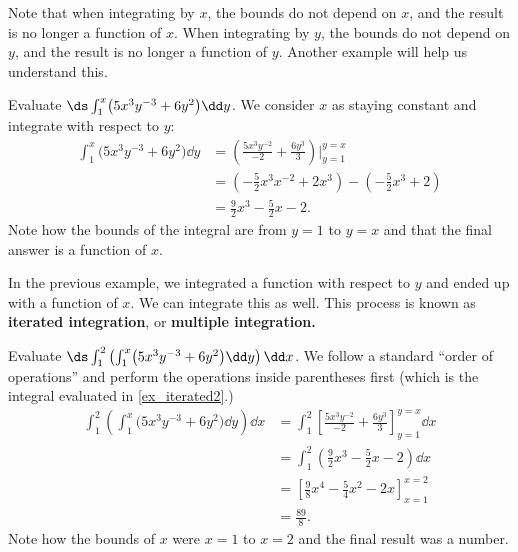 Note that when integrating by $x$, the bounds do not depend on $x$, and the result is no longer a function of $x$.  When integrating by $y$, the bounds do not depend on $y$, and the result is no longer a function of $y$. Another example will help us understand this.

\begin{example}\label{ex_iterated2}%
Evaluate $\ds \int_1^x\bigl(5x^3y^{-3}+6y^2\bigr)\dd y$.
\solution
We consider $x$ as staying constant and integrate with respect to $y$:
\begin{align*}
\int_1^x\bigl(5x^3y^{-3}+6y^2\bigr)\dd y & = \left(\frac{5x^3y^{-2}}{-2}+\frac{6y^3}{3}\right)\Bigg|_{y=1}^{y=x} \\
						&= \left(-\frac52x^3x^{-2}+2x^3\right) - \left(-\frac52x^3+2\right) \\
						&= \frac92x^3-\frac52x-2.
\end{align*}
Note how the bounds of the integral are from $y=1$ to $y=x$ and that the final answer is a function of $x$.
\end{example}

In the previous example, we integrated a function with respect to $y$ and ended up with a function of $x$. We can integrate this as well. This process is known as \textbf{iterated integration}, or \textbf{multiple integration.}


\begin{example}\label{ex_iterated3}%
Evaluate $\ds \int_1^2\left(\int_1^x\bigl(5x^3y^{-3}+6y^2\bigr)\dd y\right)\dd x$.
\solution
We follow a standard ``order of operations'' and perform the operations inside parentheses first (which is the integral evaluated in \autoref{ex_iterated2}.)
\begin{align*}
\int_1^2\left(\int_1^x\bigl(5x^3y^{-3}+6y^2\bigr)\dd y\right)\dd x
	&= \int_1^2 \left[\frac{5x^3y^{-2}}{-2}+\frac{6y^3}{3}\right]_{y=1}^{y=x}\dd x \\
	&= \int_1^2 \left(\frac92x^3-\frac52x-2\right)\dd x \\
	&= \left[\frac98x^4-\frac54x^2-2x\right]_{x=1}^{x=2}\\
	&= \frac{89}8.
\end{align*}
Note how the bounds of $x$ were $x=1$ to $x=2$ and the final result was a number.
\end{example}

